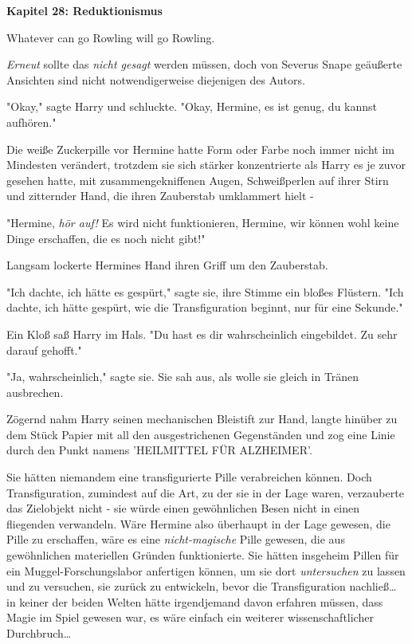 

\hypertarget{reduktionismus}{%

\textbf{Kapitel 28: Reduktionismus}

Whatever can go Rowling will go Rowling.

\emph{Erneut} sollte das \emph{nicht gesagt} werden müssen, doch von Severus Snape geäußerte Ansichten sind nicht notwendigerweise diejenigen des Autors.

\later

"Okay," sagte Harry und schluckte. "Okay, Hermine, es ist genug, du kannst aufhören."

Die weiße Zuckerpille vor Hermine hatte Form oder Farbe noch immer nicht im Mindesten verändert, trotzdem sie sich stärker konzentrierte als Harry es je zuvor gesehen hatte, mit zusammengekniffenen Augen, Schweißperlen auf ihrer Stirn und zitternder Hand, die ihren Zauberstab umklammert hielt -

"Hermine, \emph{hör auf!} Es wird nicht funktionieren, Hermine, wir können wohl keine Dinge erschaffen, die es noch nicht gibt!"

Langsam lockerte Hermines Hand ihren Griff um den Zauberstab.

"Ich dachte, ich hätte es gespürt," sagte sie, ihre Stimme ein bloßes Flüstern. "Ich dachte, ich hätte gespürt, wie die Transfiguration beginnt, nur für eine Sekunde."

Ein Kloß saß Harry im Hals. "Du hast es dir wahrscheinlich eingebildet. Zu sehr darauf gehofft."

"Ja, wahrscheinlich," sagte sie. Sie sah aus, als wolle sie gleich in Tränen ausbrechen.

Zögernd nahm Harry seinen mechanischen Bleistift zur Hand, langte hinüber zu dem Stück Papier mit all den ausgestrichenen Gegenständen und zog eine Linie durch den Punkt namens 'HEILMITTEL FÜR ALZHEIMER'.

Sie hätten niemandem eine transfigurierte Pille verabreichen können. Doch Transfiguration, zumindest auf die Art, zu der sie in der Lage waren, verzauberte das Zielobjekt nicht - sie würde einen gewöhnlichen Besen nicht in einen fliegenden verwandeln. Wäre Hermine also überhaupt in der Lage gewesen, die Pille zu erschaffen, wäre es eine \emph{nicht-magische} Pille gewesen, die aus gewöhnlichen materiellen Gründen funktionierte. Sie hätten insgeheim Pillen für ein Muggel-Forschungslabor anfertigen können, um sie dort \emph{untersuchen} zu lassen und zu versuchen, sie zurück zu entwickeln, bevor die Transfiguration nachließ… in keiner der beiden Welten hätte irgendjemand davon erfahren müssen, dass Magie im Spiel gewesen war, es wäre einfach ein weiterer wissenschaftlicher Durchbruch…

}
